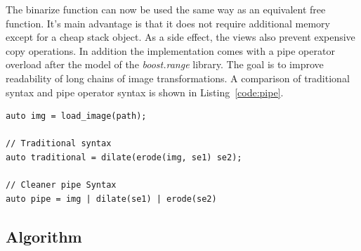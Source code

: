 \documentclass[runningheads,a4paper]{llncs}
\begin{document}
The binarize function can now be used the same way as an equivalent free
function. It's main advantage is that it does not require additional memory
except for a cheap stack object. As a side effect, the views also prevent
expensive copy operations. In addition the implementation comes with a pipe
operator overload after the model of the \emph{boost.range} library. The goal is
to improve readability of long chains of image transformations. A comparison of
traditional syntax and pipe operator syntax is shown in Listing~\ref{code:pipe}.

\begin{lstlisting}[caption=View Syntax, label=code:pipe]
auto img = load_image(path);

// Traditional syntax
auto traditional = dilate(erode(img, se1) se2);

// Cleaner pipe Syntax
auto pipe = img | dilate(se1) | erode(se2)
\end{lstlisting}


\subsection{Algorithm}
\end{document}
